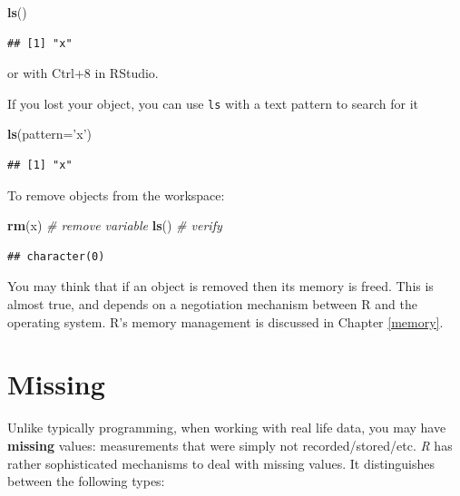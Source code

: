 \documentclass[]{book}
\newenvironment{Shaded}{\begin{snugshade}}{\end{snugshade}}
\newcommand{\KeywordTok}[1]{\textcolor[rgb]{0.13,0.29,0.53}{\textbf{#1}}}
\newcommand{\DataTypeTok}[1]{\textcolor[rgb]{0.13,0.29,0.53}{#1}}
\newcommand{\StringTok}[1]{\textcolor[rgb]{0.31,0.60,0.02}{#1}}
\newcommand{\CommentTok}[1]{\textcolor[rgb]{0.56,0.35,0.01}{\textit{#1}}}
\newcommand{\NormalTok}[1]{#1}
\theoremstyle{definition}
\theoremstyle{definition}
\theoremstyle{definition}
\theoremstyle{remark}
\begin{document}
\begin{Shaded}
\begin{Highlighting}[]
\KeywordTok{ls}\NormalTok{()}
\end{Highlighting}
\end{Shaded}

\begin{verbatim}
## [1] "x"
\end{verbatim}

or with Ctrl+8 in RStudio.

If you lost your object, you can use \texttt{ls} with a text pattern to
search for it

\begin{Shaded}
\begin{Highlighting}[]
\KeywordTok{ls}\NormalTok{(}\DataTypeTok{pattern=}\StringTok{'x'}\NormalTok{)}
\end{Highlighting}
\end{Shaded}

\begin{verbatim}
## [1] "x"
\end{verbatim}

To remove objects from the workspace:

\begin{Shaded}
\begin{Highlighting}[]
\KeywordTok{rm}\NormalTok{(x) }\CommentTok{# remove variable}
\KeywordTok{ls}\NormalTok{() }\CommentTok{# verify}
\end{Highlighting}
\end{Shaded}

\begin{verbatim}
## character(0)
\end{verbatim}

You may think that if an object is removed then its memory is freed.
This is almost true, and depends on a negotiation mechanism between R
and the operating system. R's memory management is discussed in Chapter
\ref{memory}.

\section{Missing}\label{missing}

Unlike typically programming, when working with real life data, you may
have \textbf{missing} values: measurements that were simply not
recorded/stored/etc. \emph{R} has rather sophisticated mechanisms to
deal with missing values. It distinguishes between the following types:
\end{document}
